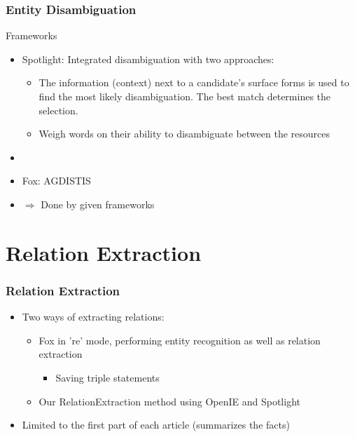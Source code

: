 \documentclass{beamer}
\begin{document}
\begin{frame}
\frametitle{Entity Disambiguation}
\begin{block}{Frameworks}
\begin{itemize}
	\item Spotlight: Integrated disambiguation with two approaches: 
	\begin{itemize}
		\item The information (context) next to a candidate's surface forms is used to find the most likely disambiguation. The best match determines the selection.
		\item Weigh words on their ability to disambiguate between the resources
	\end{itemize}
	\item[] \cite{p2}
	\item Fox: AGDISTIS
\end{itemize}
\end{block}
\begin{itemize}
	\item[] $\Rightarrow$ Done by given frameworks
\end{itemize}

\end{frame}


\section{Relation Extraction}

\begin{frame}
\frametitle{Relation Extraction}
\begin{itemize}
	\item Two ways of extracting relations:
	\begin{itemize}
		\item Fox in 're' mode, performing entity recognition as well as relation extraction
		\begin{itemize}
			\item Saving triple statements
		\end{itemize}
		\item Our RelationExtraction method using OpenIE and Spotlight 
	\end{itemize}
	\item Limited to the first part of each article (summarizes the facts)
\end{itemize}
\end{frame}
\end{document}
